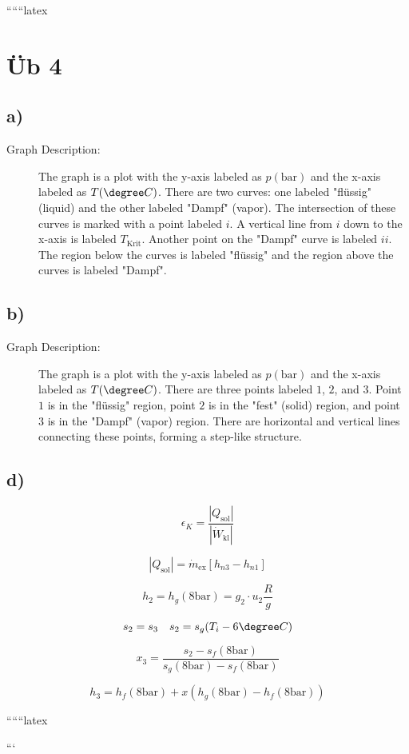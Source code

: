 
``````latex


\section*{Üb 4}

\subsection*{a)}

\begin{description}
    \item[Graph Description:] The graph is a plot with the y-axis labeled as \( p(\text{bar}) \) and the x-axis labeled as \( T(\degree C) \). There are two curves: one labeled "flüssig" (liquid) and the other labeled "Dampf" (vapor). The intersection of these curves is marked with a point labeled \( i \). A vertical line from \( i \) down to the x-axis is labeled \( T_{\text{Krit}} \). Another point on the "Dampf" curve is labeled \( ii \). The region below the curves is labeled "flüssig" and the region above the curves is labeled "Dampf".
\end{description}

\subsection*{b)}

\begin{description}
    \item[Graph Description:] The graph is a plot with the y-axis labeled as \( p(\text{bar}) \) and the x-axis labeled as \( T(\degree C) \). There are three points labeled \( 1 \), \( 2 \), and \( 3 \). Point \( 1 \) is in the "flüssig" region, point \( 2 \) is in the "fest" (solid) region, and point \( 3 \) is in the "Dampf" (vapor) region. There are horizontal and vertical lines connecting these points, forming a step-like structure.
\end{description}

\subsection*{d)}

\[
\epsilon_K = \frac{|Q_{\text{sol}}|}{|\dot{W}_{\text{kl}}|}
\]

\[
|Q_{\text{sol}}| = \dot{m}_{\text{ex}} \left[ h_{n3} - h_{n1} \right]
\]

\[
h_2 = h_g (8 \text{bar}) = g_2 \cdot u_2 \frac{R}{g}
\]

\[
s_2 = s_3 \quad s_2 = s_g (T_i - 6 \degree C)
\]

\[
x_3 = \frac{s_2 - s_f (8 \text{bar})}{s_g (8 \text{bar}) - s_f (8 \text{bar})}
\]

\[
h_3 = h_f (8 \text{bar}) + x \left( h_g (8 \text{bar}) - h_f (8 \text{bar}) \right)
\]

``````latex


```